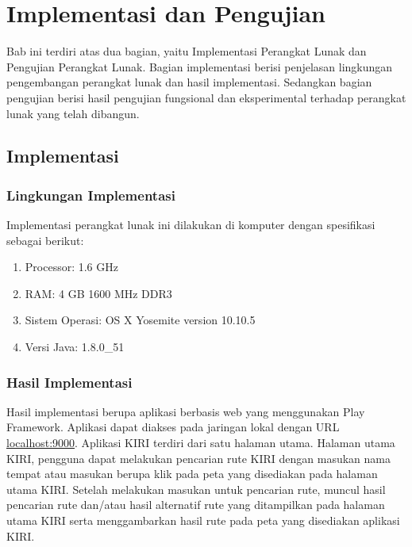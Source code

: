 \chapter{Implementasi dan Pengujian}
\label{chap:implementasiPengujian}

Bab ini terdiri atas dua bagian, yaitu Implementasi Perangkat Lunak dan Pengujian Perangkat Lunak. Bagian implementasi berisi penjelasan lingkungan pengembangan perangkat lunak dan hasil implementasi. Sedangkan bagian pengujian berisi hasil pengujian fungsional dan eksperimental terhadap perangkat lunak yang telah dibangun.

\section{Implementasi}
\label{sec:implementasi}

\subsection{Lingkungan Implementasi}
\label{sec:lingkungan_implementasi}
Implementasi perangkat lunak ini dilakukan di komputer dengan spesifikasi sebagai berikut:
\begin{enumerate}
	\item Processor: 1.6 GHz
	\item RAM: 4 GB 1600 MHz DDR3
	\item Sistem Operasi: OS X Yosemite version 10.10.5
	\item Versi Java: 1.8.0\_51
\end{enumerate}

\subsection{Hasil Implementasi}
Hasil implementasi berupa aplikasi berbasis web yang menggunakan Play Framework. Aplikasi dapat diakses pada jaringan lokal dengan URL \url{localhost:9000}. Aplikasi KIRI terdiri dari satu halaman utama. Halaman utama KIRI, pengguna dapat melakukan pencarian rute KIRI dengan masukan nama tempat atau masukan berupa klik pada peta yang disediakan pada halaman utama KIRI. Setelah melakukan masukan untuk pencarian rute, muncul hasil pencarian rute dan/atau hasil alternatif rute yang ditampilkan pada halaman utama KIRI serta menggambarkan hasil rute pada peta yang disediakan aplikasi KIRI.

